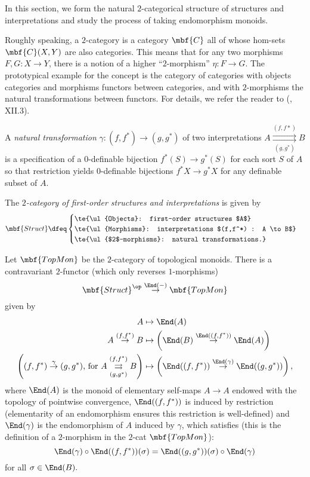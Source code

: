 In this section, we form the natural $2$-categorical structure of structures and interpretations and study the process of taking endomorphism monoids.

Roughly speaking, a $2$-category is a category $\mbf{C}$ all of whose hom-sets $\mbf{C}(X,Y)$ are also categories. This means that for any two morphisms $F, G : X \to Y$, there is a notion of a higher ``$2$-morphism'' $\eta : F \to G$. The prototypical example for the concept is the category of categories with objects categories and morphisms functors between categories, and with $2$-morphisms the natural transformations between functors. For details, we refer the reader to (\cite{maclane-cwm}, XII.3).

\begin{defn}A \emph{natural transformation} $\gamma : (f,f^*) \to (g,g^*)$ of two interpretations $A \overset{(f,f*)}{\underset{(g,g^*)}{\rightrightarrows}} B$ is a specification of a $0$-definable bijection $f^*(S) \to g^*(S)$ for each sort $S$ of $A$ so that restriction yields $0$-definable bijections $f^*X \to g^*X$ for any definable subset of $A$.\end{defn}

\begin{defn}The \emph{$2$-category of first-order structures and interpretations} is given by $$\mbf{Struct} \dfeq \begin{cases} \te{\ul{Objects}: first-order structures $A$}\\ \te{\ul{Morphisms}: interpretations $(f,f^*) : A \to B$} \\
\te{\ul{$2$-morphisms}: natural transformations.}\end{cases}$$
\end{defn}

\begin{prop}Let $\mbf{TopMon}$ be the $2$-category of topological monoids. There is a contravariant $2$-functor (which only reverses $1$-morphisms) $$\mbf{Struct}^{\op} \overset{\End(-)}{\to} \mbf{TopMon}$$ given by
\begin{align*}
A &\mapsto \End(A) \\
A \overset{(f,f^*)}{\to} B &\mapsto \left(\End(B) \overset{\End((f,f^*))}{\to} \End(A)\right)\\
\left((f,f^*) \overset{\gamma}{\to} (g,g^*) \text{, for } A \overset{(f,f^*)}{\underset{(g,g^*)}{\rightrightarrows}} B\right) &\mapsto \left(\End((f,f^*)) \overset{\End(\gamma)}{\to} \End((g,g^*))\right),
\end{align*} where $\End(A)$ is the monoid of elementary self-maps $A \to A$ endowed with the topology of pointwise convergence, $\End((f,f^*))$ is induced by restriction (elementarity of an endomorphism ensures this restriction is well-defined) and $\End(\gamma)$ is the endomorphism of $A$ induced by $\gamma$, which satisfies (this is the definition of a $2$-morphism in the $2$-cat $\mbf{TopMon}$): $$\End(\gamma) \circ \End((f,f^*))(\sigma) = \End((g,g^*))(\sigma) \circ \End(\gamma)$$ for all $\sigma \in \End(B).$\end{prop}

